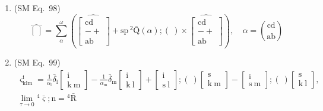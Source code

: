 \documentclass[12pt]{article}
\begin{document}
\begin{enumerate}[label=(\arabic*), series=formellist]
    \item (SM Eq.\ 98) 
    \[
    \widehat{[\ ]} = \sum_\alpha^\omega \left( \widehat{\left[ \begin{smallmatrix} \mathrm{cd} \\ - + \\ \mathrm{ab} \end{smallmatrix} \right]} + \mathrm{sp}\,{}^2\bar{\mathrm{Q}}(\alpha);(\ ) \times \widehat{\left[ \begin{smallmatrix} \mathrm{cd} \\ - + \\ \mathrm{ab} \end{smallmatrix} \right]} \right), \quad \alpha = \binom{\mathrm{cd}}{\mathrm{ab}}
    \]

    \item (SM Eq.\ 99) 
    \[
    \begin{gathered}
    \varsigma^\mathrm{i}_{\mathrm{klm}} = \frac{1}{\alpha_\mathrm{l}}\bar{\delta}_\mathrm{l} \left[ \begin{smallmatrix} \mathrm{i} \\ \mathrm{k}\ \mathrm{m} \end{smallmatrix} \right] - \frac{1}{\alpha_\mathrm{m}}\bar{\delta}_\mathrm{m} \left[ \begin{smallmatrix} \mathrm{i} \\ \mathrm{k}\ \mathrm{l} \end{smallmatrix} \right] + \left[ \begin{smallmatrix} \mathrm{i} \\ \mathrm{s}\ \mathrm{l} \end{smallmatrix} \right];(\ ) \left[ \begin{smallmatrix} \mathrm{s} \\ \mathrm{k}\ \mathrm{m} \end{smallmatrix} \right] - \left[ \begin{smallmatrix} \mathrm{i} \\ \mathrm{s}\ \mathrm{m} \end{smallmatrix} \right];(\ ) \left[ \begin{smallmatrix} \mathrm{s} \\ \mathrm{k}\ \mathrm{l} \end{smallmatrix} \right], \\
    \lim_{\tau \to 0} {}^4\bar{\bm{\varsigma}} ; \mathrm{n} = {}^4\bar{\mathrm{R}}
    \end{gathered}
    \]


\end{enumerate}
\end{document}
